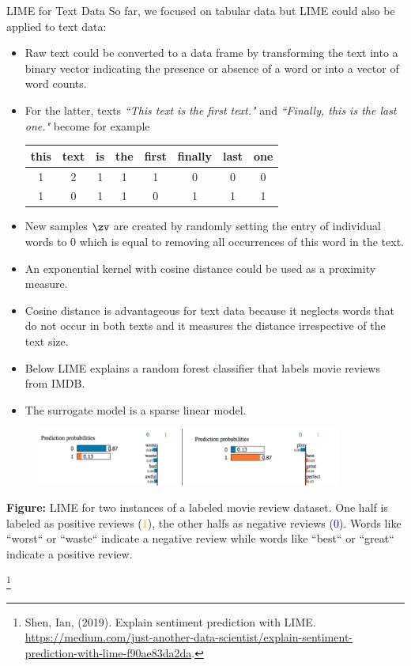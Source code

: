 \documentclass[11pt,compress,t,notes=noshow, xcolor=table]{beamer}
\begin{document}
\begin{vbframe}{LIME for Text Data}
	So far, we focused on tabular data but LIME could also be applied to text data: 
	\begin{itemize}
		\item Raw text could be converted to a data frame by transforming the text into a binary vector indicating the presence or absence of a word or into a vector of word counts.
		\item For the latter, texts \textit{``This text is the first text."} and \textit{``Finally, this is the last one."} become for example 
		\begin{center}
			\begin{tabular}{c|c|c|c|c|c|c|c} 
				this & text & is & the & first & finally & last & one \\ 
				\hline
				1 & 2 & 1 & 1 & 1 & 0 & 0 & 0 \\
				1 & 0 & 1 & 1 & 0 & 1 & 1 & 1 \\
			\end{tabular}
		\end{center} 
		\item New samples $\zv$ are created by randomly setting the entry of individual words to $0$ which is equal to removing all occurrences of this word in the text. 
		\item An exponential kernel with cosine distance could be used as a proximity measure. 
		\item Cosine distance is advantageous for text data because it neglects words that do not occur in both texts and it measures the distance irrespective of the text size. 
		\item Below LIME explains a random forest classifier that labels movie reviews from IMDB. 
		\item The surrogate model is a sparse linear model. 
	\end{itemize}
	
	\begin{figure}
		\begin{center}
			\includegraphics[width=0.9\textwidth]{figure/lime_movier}
		\end{center}
	\end{figure}
	
	
	\scriptsize{\textbf{Figure:} LIME for two instances of a labeled movie review dataset. One half is labeled as positive reviews (\textcolor{orange}{1}), 
		the other halfs as negative reviews (\textcolor{blue}{0}). Words like ``worst`` or ``waste`` indicate a negative review while words like ``best`` or ``great`` indicate a positive review.}
	
	\footnote[frame]{Shen, Ian, (2019). Explain sentiment prediction with LIME.
		\url{https://medium.com/just-another-data-scientist/explain-sentiment-prediction-with-lime-f90ae83da2da}.}
	
	
	\end{vbframe}
	
\end{document}
